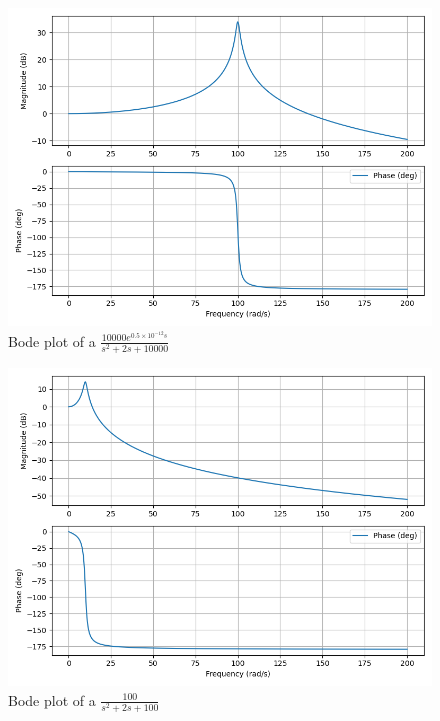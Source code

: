 \documentclass[journal,12pt,onecolumn]{IEEEtran}
\theoremstyle{remark}
\begin{document}
\begin{figure}[h]
    \centering
    \includegraphics[width=\linewidth]{2023/IN/43/figs/C.png}
    \caption{Bode plot of a $\frac{10000e^{0.5\times10^{-12}s}}{s^2+2s+10000}$}
\end{figure}
\begin{figure}[h]
    \centering
    \includegraphics[width=\linewidth]{2023/IN/43/figs/D.png}
    \caption{Bode plot of a $\frac{100}{s^2+2s+100}$}
\end{figure}
\end{document}
